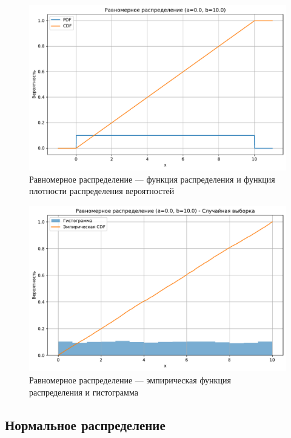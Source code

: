 \documentclass[a4paper,oneside,14pt]{extarticle}
\begin{document}
\begin{figure}[H]
	\centering
	\includegraphics[scale=0.6]{img/th_regular.pdf}
	\caption{Равномерное распределение --- функция распределения и функция плотности распределения вероятностей}
	\label{fig:}
\end{figure}

\begin{figure}[H]
	\centering
	\includegraphics[scale=0.6]{img/emp_regular.pdf}
	\caption{Равномерное распределение --- эмпирическая функция распределения и гистограмма}
	\label{fig:}
\end{figure}

\subsection{Нормальное распределение}
\end{document}
